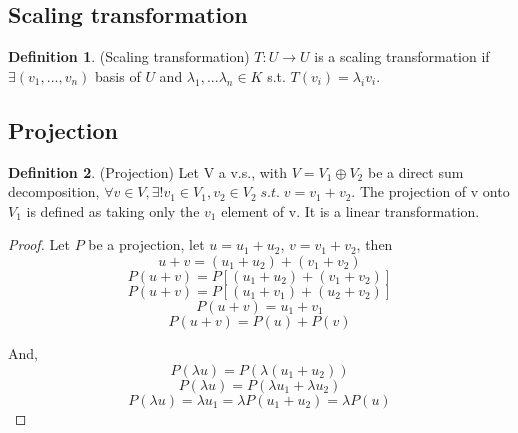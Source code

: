 \documentclass[12pt]{article}
\theoremstyle{definition}
\newtheorem{definition}{Definition}[section]
\theoremstyle{remark}
\begin{document}
    \subsection{Scaling transformation}
    \begin{definition}(Scaling transformation)
        $ T: U \rightarrow U$ is a scaling transformation if $\exists (v_1, ..., v_n)$ basis of $U$
        and $\lambda_1, ... \lambda_n \in K$ s.t. $T(v_i) = \lambda_i v_i$. 
    \end{definition}
    \subsection{Projection}
    \begin{definition}(Projection)
        Let V a v.s., with $V = V_1\oplus V_2 $ be a direct sum decomposition, 
        $ \forall  v\in V,\exists! v_1 \in V_1, v_2 \in V_2 \; s.t. \; v= v_1 + v_2$. The projection of v onto $V_1$ is 
        defined as taking only the $v_1$ element of v. It is a linear transformation. 
        \begin{proof}
            Let $P$ be a projection, let $u=u_1 + u_2$, $v= v_1+ v_2$, then
            $$u+v =  (u_1 + u_2) +(v_1+ v_2) $$
            $$P(u+v)= P[(u_1 + u_2) +(v_1+ v_2)]$$
            $$ P(u+v) = P[(u_1 +v_1) +(u_2 + v_2)]$$
            $$ P(u+v) = u_1 + v_1$$
            $$ P(u+v) = P(u)+P(v)$$

        And, $$P(\lambda u) = P(\lambda( u_1 +u_2))$$
        $$P(\lambda u) = P(\lambda u_1 + \lambda u_2)$$
        $$P(\lambda u) = \lambda u_1 = \lambda P(u_1 + u_2) =\lambda P(u)$$
        \end{proof}
    \end{definition}
\end{document}
